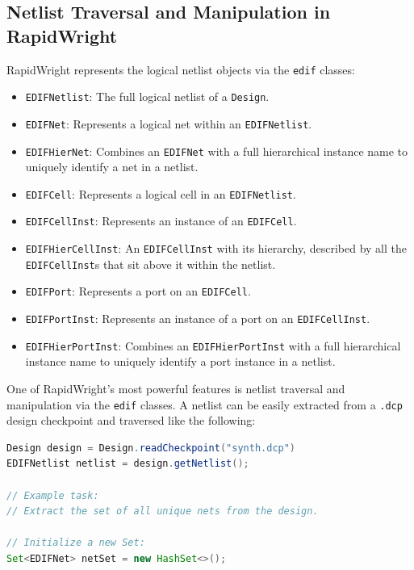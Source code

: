 \newpage
\begin{multicols}{2}

\subsection{Netlist Traversal and Manipulation in RapidWright}

RapidWright represents the logical netlist objects via the \texttt{edif} classes:
\begin{itemize}
    \item \texttt{EDIFNetlist}: The full logical netlist of a \texttt{Design}. 
    \item \texttt{EDIFNet}: Represents a logical net within an \texttt{EDIFNetlist}.
    \item \texttt{EDIFHierNet}: Combines an \texttt{EDIFNet} with a full hierarchical instance name to uniquely identify a net in a netlist.
    \item \texttt{EDIFCell}: Represents a logical cell in an \texttt{EDIFNetlist}. 
    \item \texttt{EDIFCellInst}: Represents an instance of an \texttt{EDIFCell}. 
    \item \texttt{EDIFHierCellInst}: An \texttt{EDIFCellInst} with its hierarchy, described by all the \texttt{EDIFCellInst}s that sit above it within the netlist.
    \item \texttt{EDIFPort}: Represents a port on an \texttt{EDIFCell}. 
    \item \texttt{EDIFPortInst}: Represents an instance of a port on an \texttt{EDIFCellInst}. 
    \item \texttt{EDIFHierPortInst}: Combines an \texttt{EDIFHierPortInst} with a full hierarchical instance name to uniquely identify a port instance in a netlist. 
\end{itemize}


One of RapidWright's most powerful features is netlist traversal and manipulation via the \texttt{edif} classes. A netlist can be easily extracted from a \texttt{.dcp} design checkpoint and traversed like the following: 

\begin{lstlisting}[language=java, caption={Netlist extraction and traversal}, label={lst:netlist_extract}]
Design design = Design.readCheckpoint("synth.dcp")
EDIFNetlist netlist = design.getNetlist();

// Example task:
// Extract the set of all unique nets from the design.

// Initialize a new Set:
Set<EDIFNet> netSet = new HashSet<>();


\end{lstlisting}
\end{multicols}
